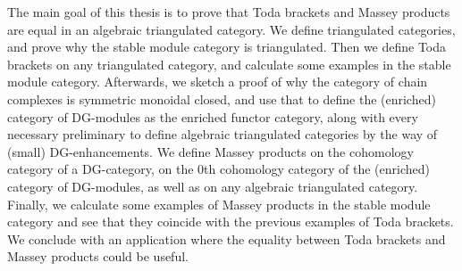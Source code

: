The main goal of this thesis is to prove that Toda brackets and Massey products are equal in an algebraic triangulated category. We define triangulated categories, and prove why the stable module category is triangulated. Then we define Toda brackets on any triangulated category, and calculate some examples in the stable module category. Afterwards, we sketch a proof of why the category of chain complexes is symmetric monoidal closed, and use that to define the (enriched) category of DG-modules as the enriched functor category, along with every necessary preliminary to define algebraic triangulated categories by the way of (small) DG-enhancements. We define Massey products on the cohomology category of a DG-category, on the 0th cohomology category of the (enriched) category of DG-modules, as well as on any algebraic triangulated category. Finally, we calculate some examples of Massey products in the stable module category and see that they coincide with the previous examples of Toda brackets. We conclude with an application where the equality between Toda brackets and Massey products could be useful.